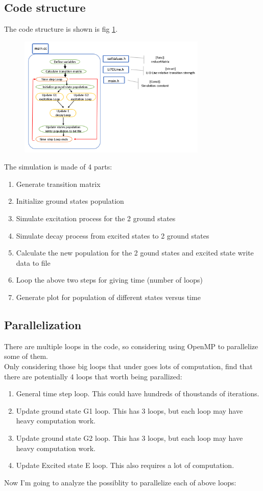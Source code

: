 \documentclass[a4paper, 10pt]{article}
\begin{document}
\subsection{Code structure}
The code structure is shown is fig \ref{fig5}. \\ 
\begin{figure}[h]
  \centering
  \caption{}
  \includegraphics[width = 0.8\textwidth]{fig5}
  \label{fig5}
\end{figure}

The simulation is made of 4 parts:
\begin{enumerate}
\item Generate transition matrix
\item Initialize ground states population
\item Simulate excitation process for the 2 ground states
\item Simulate decay process from excited states to 2 ground states
\item Calculate the new population for the 2 gound states and excited state write data to file
\item Loop the above two steps for giving time (number of loops)
\item Generate plot for population of different states versus time
\end{enumerate}


\subsection{Parallelization}
There are multiple loops in the code, so considering using OpenMP to parallelize some of them. \\
Only considering those big loops that under goes lots of computation, find that there are potentially 4 loops that worth being parallized:
\begin{enumerate}
\item General time step loop. This could have hundreds of thoustands of iterations.
\item Update ground state G1 loop. This has 3 loops, but each loop may have heavy computation work.
\item Update ground state G2 loop. This has 3 loops, but each loop may have heavy computation work.
\item Update Excited state E loop. This also requires a lot of computation.
\end{enumerate}
Now I'm going to analyze the possiblity to parallelize each of above loops:\\
\end{document}
